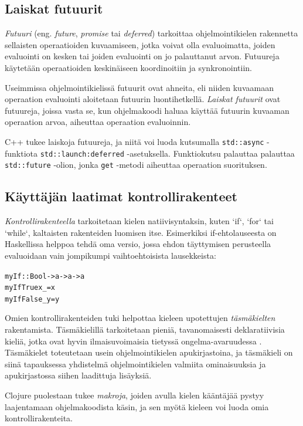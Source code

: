 \subsection{Laiskat futuurit}
\textit{Futuuri} (eng. \textit{future}, \textit{promise} tai \textit{deferred}) tarkoittaa ohjelmointikielen rakennetta sellaisten operaatioiden kuvaamiseen, jotka voivat olla evaluoimatta, joiden evaluointi on kesken tai joiden evaluointi on jo palauttanut arvon. Futuureja käytetään operaatioiden keskinäiseen koordinoitiin ja synkronointiin.

Useimmissa ohjelmointikielissä futuurit ovat ahneita, eli niiden kuvaamaan operaation evaluointi aloitetaan futuurin luontihetkellä. \textit{Laiskat futuurit} ovat futuureja, joissa vasta se, kun ohjelmakoodi haluaa käyttää futuurin kuvaaman operaation arvoa, aiheuttaa operaation evaluoinnin.

C++ tukee laiskoja futuureja, ja niitä voi luoda kutsumalla \verb!std::async! -funktiota \verb!std::launch:deferred! -asetuksella. Funktiokutsu palauttaa palauttaa \verb!std::future! -olion, jonka \verb!get! -metodi aiheuttaa operaation suorituksen.

\subsection{Käyttäjän laatimat kontrollirakenteet}

\textit{Kontrollirakenteella} tarkoitetaan kielen natiivisyntaksin, kuten `if`, `for` tai `while`, kaltaisten rakenteiden luomisen itse. Esimerkiksi if-ehtolauseesta on Haskellissa helppoa tehdä oma versio, jossa ehdon täyttymisen perusteella evaluoidaan vain jompikumpi vaihtoehtoisista lausekkeista:

\begin{alltt}
myIf :: Bool -> a -> a -> a
myIf True  x _ = x
myIf False _ y = y
\end{alltt}

Omien kontrollirakenteiden tuki helpottaa kieleen upotettujen \textit{täsmäkielten} rakentamista. Täsmäkielillä tarkoitetaan pieniä, tavanomaisesti deklaratiivisia kieliä, jotka ovat hyvin ilmaisuvoimaisia tietyssä ongelma-avaruudessa \citep{van2000domain}. Täsmäkielet toteutetaan usein ohjelmointikielen apukirjastoina, ja täsmäkieli on siinä tapauksessa yhdistelmä ohjelmointikielen valmiita ominaisuuksia ja apukirjastossa siihen laadittuja lisäyksiä.

Clojure puolestaan tukee \textit{makroja}, joiden avulla kielen kääntäjää pystyy laajentamaan ohjelmakoodista käsin, ja sen myötä kieleen voi luoda omia kontrollirakenteita.

